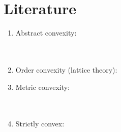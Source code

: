 \section{Literature}
\begin{survey}
\begin{enumerate}
  \item Abstract convexity:
    \\
    \\ 
    \\

  \item Order convexity (lattice theory):
    \\

  \item Metric convexity:
    \\
    \\
    \\

  \item Strictly convex:
    \\

\end{enumerate}
\end{survey}




